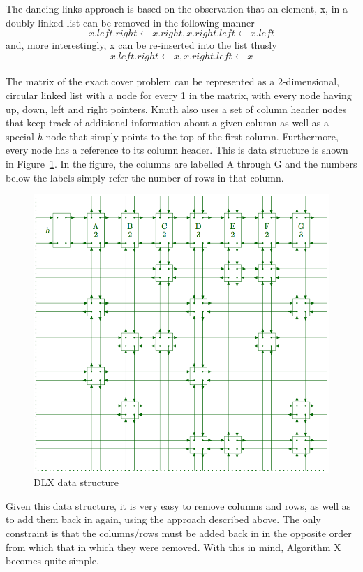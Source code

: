 \documentclass[12pt]{article}
\newcounter{row}
\newcounter{col}
\begin{document}
The dancing links approach is based on the observation that an element, x, in a doubly linked list can be removed in the following manner
\[ x.left.right \gets x.right, x.right.left \gets x.left \]
and, more interestingly, x can be re-inserted into the list thusly
\[ x.left.right \gets x, x.right.left \gets x \]
\\
The matrix of the exact cover problem can be represented as a 2-dimensional, circular linked list with a node for every 1 in the matrix, with every node having up, down, left and right pointers. Knuth also uses a set of column header nodes that keep track of additional information about a given column as well as a special \textit{h} node that simply points to the top of the first column. Furthermore, every node has a reference to its column header. This is data structure is shown in Figure~\ref{dlx}. In the figure, the columns are labelled A through G and the numbers below the labels simply refer the number of rows in that column.
\begin{figure}[H]
\begin{center}
\includegraphics[width=0.9\columnwidth]{dancing_links}
\caption{DLX data structure}
\label{dlx}
\end{center}
\end{figure}
Given this data structure, it is very easy to remove columns and rows, as well as to add them back in again, using the approach described above. The only constraint is that the columns/rows must be added back in in the opposite order from which that in which they were removed. With this in mind, Algorithm X becomes quite simple. \\ 
\end{document}
